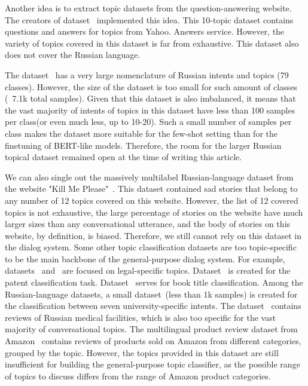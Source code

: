 Another idea is to extract topic datasets from the question-answering website. The creators of dataset~\cite{yahoo_answers_topics} implemented this idea. This 10-topic dataset contains questions and answers for topics from Yahoo. Answers service. However, the variety of topics covered in this dataset is far from exhaustive. This dataset also does not cover the Russian language. 

The dataset~\cite{chatbotru} has a very large nomenclature of Russian intents and topics (79 classes). However, the size of the dataset is too small for such amount of classes (~7.1k total samples). Given that this dataset is also imbalanced, it means that the vast majority of intents of topics in this dataset have less than 100 samples per class(or even much less, up to 10-20). Such a small number of samples per class makes the dataset more suitable for the few-shot setting than for the finetuning of BERT-like models. Therefore, the room for the larger Russian topical dataset remained open at the time of writing this article. 

We can also single out the massively multilabel Russian-language dataset from the website "Kill Me Please"~\cite{kill_me_please}. This dataset contained sad stories that belong to any number of 12 topics covered on this website. However, the list of 12 covered topics is not exhaustive, the large percentage of stories on the website have much larger sizes than any conversational utterance, and the body of stories on this website, by definition, is biased. Therefore, we still cannot rely on this dataset in the dialog system.
Some other topic classification datasets are too topic-specific to be the main backbone of the general-purpose dialog system. For example, datasets~\cite{lexglue} and~\cite{lextreme} are focused on legal-specific topics. Dataset~\cite{hupd} is created for the patent classification task. Dataset~\cite{blbooksgenre} serves for book title classification.
 Among the Russian-language datasets, a small dataset~\cite{pstu}(less than 1k samples) is created for the classification between seven university-specific intents. The dataset~\cite{healthcare_facilities_reviews} contains reviews of Russian medical facilities, which is also too specific for the vast majority of conversational topics. 
The multilingual product review dataset from Amazon~\cite{amazon_reviews} contains reviews of products sold on Amazon from different categories, grouped by the topic. However, the topics provided in this dataset are still insufficient for building the general-purpose topic classifier, as the possible range of topics to discuss differs from the range of Amazon product categories. 

